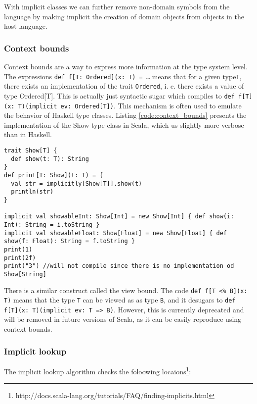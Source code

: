 With implicit classes we can further remove non-domain symbols from the language by making implicit the creation of domain objects from objects in the host language.

\subsubsection{Context bounds}
Context bounds are a way to express more information at the type system level. The expressions \texttt{def f[T: Ordered](x: T) = \ldots} means that for a given type\texttt{T}, there exists an implementation of the trait \texttt{Ordered}, i. e. there exists a value of type Ordered[T]. This is actually just syntactic sugar which compiles to \texttt{def f[T](x: T)(implicit ev: Ordered[T])}. This mechanism is often used to emulate the behavior of Haskell type classes. Listing \ref{code:context_bounds} presents the implementation of the Show type class in Scala, which us slightly more verbose than in Haskell.

\begin{lstlisting}[caption=Context bounds, label=code:context_bounds, float]
trait Show[T] {
  def show(t: T): String
}
def print[T: Show](t: T) = {
  val str = implicitly[Show[T]].show(t)
  println(str)
}

implicit val showableInt: Show[Int] = new Show[Int] { def show(i: Int): String = i.toString }
implicit val showableFloat: Show[Float] = new Show[Float] { def show(f: Float): String = f.toString }
print(1)
print(2f)
print("3") //will not compile since there is no implementation od Show[String]
\end{lstlisting}

There is a similar construct called the view bound. The code \texttt{def f[T <\% B](x: T)} means that the type \texttt{T} can be viewed as as type \texttt{B}, and it desugars to \texttt{def f[T](x: T)(implicit ev: T => B)}. However, this is currently deprecated and will be removed in future versions of Scala, as it can be easily reproduce using context bounds.

\subsubsection{Implicit lookup}

The implicit lookup algorithm checks the foloowing locaions\footnote{http://docs.scala-lang.org/tutorials/FAQ/finding-implicits.html}: 

